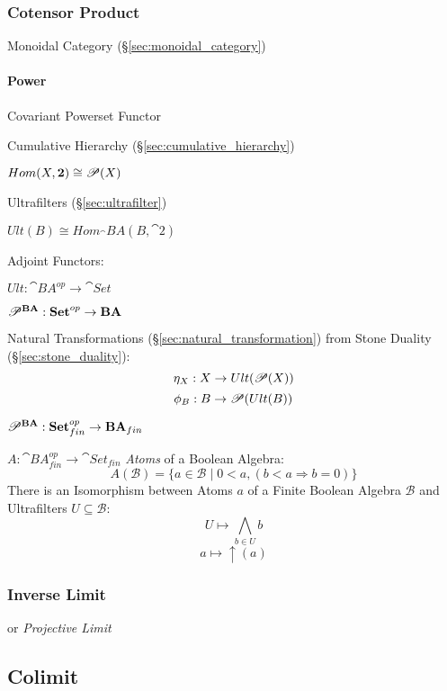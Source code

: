 \subsubsection{Cotensor Product}\label{sec:cotensor_product}

Monoidal Category (\S\ref{sec:monoidal_category})



\paragraph{Power}\label{sec:power}\hfill

Covariant Powerset Functor %

Cumulative Hierarchy (\S\ref{sec:cumulative_hierarchy})

$Hom(X,\mathbf{2}) \cong \mathscr{P}(X)$

Ultrafilters (\S\ref{sec:ultrafilter})

$Ult(B) \cong Hom_\cat{BA}(B,\cat{2})$

Adjoint Functors:

$Ult : \cat{BA}^{op} \rightarrow \cat{Set}$

$\mathscr{P}^\mathbf{BA} : \mathbf{Set}^{op} \rightarrow \mathbf{BA}$

Natural Transformations (\S\ref{sec:natural_transformation}) from
Stone Duality (\S\ref{sec:stone_duality}):
\[
  \eta_X : X \rightarrow Ult(\mathscr{P}(X))
\]\[
  \phi_B : B \rightarrow \mathscr{P}(Ult(B))
\]

$\mathscr{P}^\mathbf{BA} :
  \mathbf{Set}^{op}_{fin} \rightarrow \mathbf{BA}_{fin}$

$A : \cat{BA}^{op}_{fin} \rightarrow \cat{Set}_{fin}$
\emph{Atoms} of a Boolean Algebra:
\[
  A(\mathcal{B}) = \{ a \in \mathcal{B} \;|\;
    0 < a, (b < a \Rightarrow b = 0) \}
\]
There is an Isomorphism between Atoms $a$ of a Finite Boolean Algebra
$\mathcal{B}$ and Ultrafilters $U \subseteq \mathcal{B}$:
\[
  U \mapsto \bigwedge_{b \in U} b
\]\[
  a \mapsto \uparrow (a)
\]



\subsubsection{Inverse Limit}\label{sec:inverse_limit}

or \emph{Projective Limit}



\subsection{Colimit}\label{sec:colimit}

